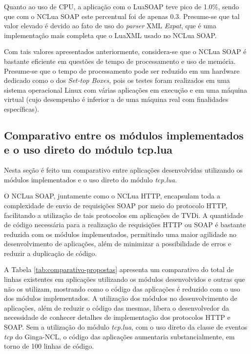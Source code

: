 Quanto ao uso de CPU, a aplicação com o LuaSOAP teve pico de 1.0\%, sendo que com o NCLua SOAP
este percentual foi de apenas 0.3. Presume-se que tal valor elevado é devido
ao fato de uso do \textit{parser} XML \textit{Expat}, que é uma implementação mais
completa que o LuaXML usado no NCLua SOAP.

Com tais valores apresentados anteriormente, considera-se que o NCLua SOAP é bastante eficiente
em questões de tempo de processamento e uso de memória. 
Presume-se que o tempo de processamento pode ser reduzido em
um hardware dedicado como o dos \textit{Set-top Boxes}, pois os testes
foram realizados em uma sistema operacional Linux com várias aplicações
em execução e em uma máquina virtual (cujo desempenho é inferior a de uma máquina real
com finalidades específicas).

\subsection[Comparativo entre os módulos implementados e o tcp.lua]{Comparativo entre os módulos implementados e o uso direto do módulo tcp.lua}

Nesta seção é feito um comparativo entre aplicações desenvolvidas
utilizando os módulos implementados e o uso direto do módulo \textit{tcp.lua}\cite{doc-nclua}.

O NCLua SOAP, juntamente como o NCLua HTTP, encapsulam toda a complexidade
de envio de requisições SOAP por meio do protocolo HTTP, facilitando
a utilização de tais protocolos em aplicações de TVDi.
A quantidade de código necessária para a realização de requisições HTTP ou SOAP
é bastante reduzida com os módulos implementados, permitindo
uma maior agilidade no desenvolvimento de aplicações, além
de minimizar a possibilidade de erros e reduzir a duplicação
de código.

A Tabela \ref{tab:comparativo-propostas} apresenta um comparativo do total de linhas existentes 
em aplicações utilizando os módulos desenvolvidos e outras que não os utilizam, mostrando
como o código das aplicações é reduzido com o uso dos módulos implementados.
A utilização dos módulos no desenvolvimento de aplicações, além
de reduzir o código das mesmas, libera o desenvolvedor da necessidade
de conhecer detalhes de implementação dos protocolos HTTP e SOAP.
Sem a utilização do módulo \textit{tcp.lua}, com o uso direto da classe de eventos
\textit{tcp} do Ginga-NCL, o código das aplicações aumentaria substancialmente, em torno de 100 linhas
de código.

